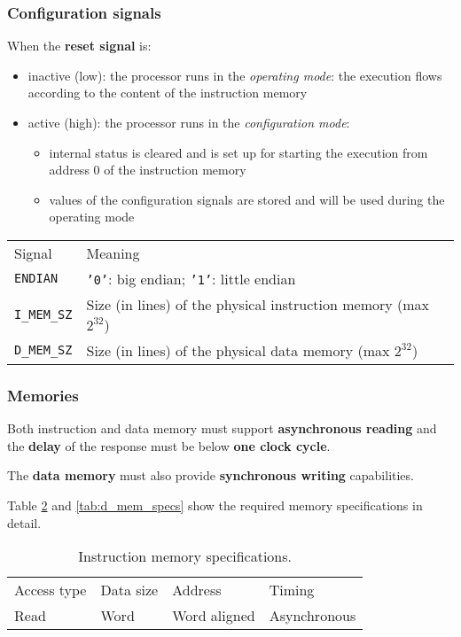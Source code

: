 \subsubsection{Configuration signals}
When the \textbf{reset signal} is:
\begin{itemize}
	\item inactive (low): the processor runs in the \textit{operating mode}:
		the execution flows according to the content of the instruction
		memory
	\item active (high): the processor runs in the \textit{configuration mode}:
		\begin{itemize}
			\item internal status is cleared and is set up for
				starting the execution from address 0 of the
				instruction memory
			\item values of the configuration signals are stored
				and will be used during the operating mode
		\end{itemize}
\end{itemize}

\begin{table}[H]
	\centering
	\begin{tabular}{ll}
		\hline
		\rowcolor{gray!50}
		Signal & Meaning \\
		\texttt{ENDIAN} & \texttt{'0'}: big endian; \texttt{'1'}: little endian \\
		\rowcolor{gray!25}
		\texttt{I\_MEM\_SZ} & Size (in lines) of the physical instruction
			memory (max $2^{32}$) \\
		\texttt{D\_MEM\_SZ} & Size (in lines) of the physical data memory 
			(max $2^{32}$) \\
		\hline
	\end{tabular}
	\label{tab:config_signals}
\end{table}

\subsubsection{Memories}
Both instruction and data memory must support \textbf{asynchronous reading} and
the \textbf{delay} of the response must be below \textbf{one clock cycle}.

The \textbf{data memory} must also provide \textbf{synchronous writing} capabilities.

\bigskip
Table \ref{tab:i_mem_specs} and \ref{tab:d_mem_specs} show the required memory
specifications in detail.

\begin{table}[H]
	\centering
	\begin{tabular}{llll}
		\hline
		\rowcolor{gray!50}
		Access type & Data size & Address & Timing \\
		Read & Word & Word aligned & Asynchronous \\
		\hline
	\end{tabular}
	\caption{Instruction memory specifications.}
	\label{tab:i_mem_specs}
\end{table}

